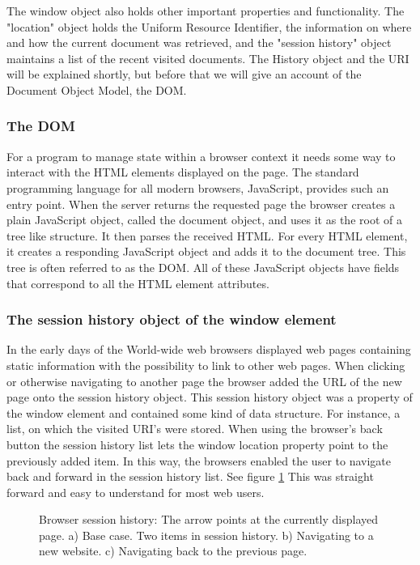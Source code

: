 \documentclass[english]{ifimaster}
\begin{document}
The window object also holds other important properties and functionality. The "location" object holds the Uniform Resource Identifier, the information on where and how the current document was retrieved, and the "session history" object maintains a list of the recent visited documents. The History object and the URI will be explained shortly, but before that we will give an account of the Document Object Model, the DOM. 


\subsubsection{The DOM}
For a program to manage state within a browser context it needs some way to interact with the HTML elements displayed on the page. The standard programming language for all modern browsers, JavaScript, provides such an entry point. When the server returns the requested page the browser creates a plain JavaScript object, called the document object, and uses it as the root of a tree like structure. It then parses the received HTML. For every HTML element, it creates a responding JavaScript object and adds it to the document tree. This tree is often referred to as the DOM. All of these JavaScript objects have fields that correspond to all the HTML element attributes. 

\subsubsection{The session history object of the window element}

In the early days of the World-wide web browsers displayed web pages containing static information with the possibility to link to other web pages. When clicking or otherwise navigating to another page the browser added the URL of the new page onto the session history object. This session history object was a property of the window element and contained some kind of data structure. For instance, a list, on which the visited URI's were stored. When using the browser's back button the session history list lets the window location property point to the previously added item. In this way, the browsers enabled the user to navigate back and forward in the session history list. See figure \ref{fig:sessionHistory} This was straight forward and easy to understand for most web users.

\begin{figure}
\centering

\caption{Browser session history: The arrow points at the currently displayed page. a) Base case. Two items in session history. b) Navigating to a new website. c) Navigating back to the previous page.} \label{fig:sessionHistory}

\end{figure}
\end{document}
